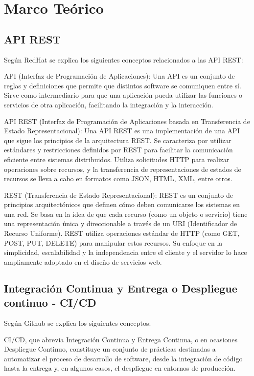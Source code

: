 \chapter{Marco Teórico}
\label{cap:marco-teorico}

\section{API REST}\label{section:mt-api-ref}
Según RedHat \cite{redhat-apirest} se explica los siguientes conceptos relacionados a las API REST:

API (Interfaz de Programación de Aplicaciones):
Una API es un conjunto de reglas y definiciones que permite que distintos software se comuniquen entre sí. Sirve como intermediario para que una aplicación pueda utilizar las funciones o servicios de otra aplicación, facilitando la integración y la interacción.

API REST (Interfaz de Programación de Aplicaciones basada en Transferencia de Estado Representacional):
Una API REST es una implementación de una API que sigue los principios de la arquitectura REST. Se caracteriza por utilizar estándares y restricciones definidos por REST para facilitar la comunicación eficiente entre sistemas distribuidos. Utiliza solicitudes HTTP para realizar operaciones sobre recursos, y la transferencia de representaciones de estados de recursos se lleva a cabo en formatos como JSON, HTML, XML, entre otros.

REST (Transferencia de Estado Representacional):
REST es un conjunto de principios arquitectónicos que definen cómo deben comunicarse los sistemas en una red. Se basa en la idea de que cada recurso (como un objeto o servicio) tiene una representación única y direccionable a través de un URI (Identificador de Recurso Uniforme). REST utiliza operaciones estándar de HTTP (como GET, POST, PUT, DELETE) para manipular estos recursos. Su enfoque en la simplicidad, escalabilidad y la independencia entre el cliente y el servidor lo hace ampliamente adoptado en el diseño de servicios web.


\section{Integración Continua y Entrega o Despliegue continuo - CI/CD}\label{sec:mt:ci-cd}
Según Github \cite{github-cicd} se explica los siguientes conceptos:


CI/CD, que abrevia Integración Continua y Entrega Continua, o en ocasiones Despliegue Continuo, constituye un conjunto de prácticas destinadas a automatizar el proceso de desarrollo de software, desde la integración de código hasta la entrega y, en algunos casos, el despliegue en entornos de producción.

